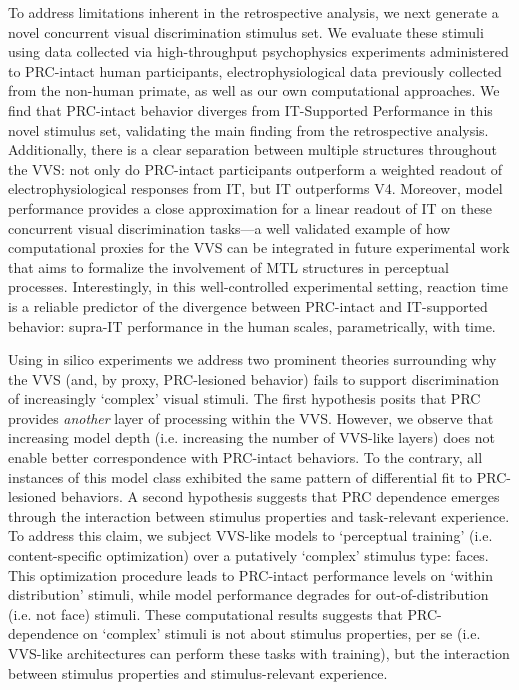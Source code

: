 \documentclass[11pt]{article}
\begin{document}
To address limitations inherent in the retrospective analysis, we next generate a novel concurrent visual discrimination stimulus set. We evaluate these stimuli using data collected via high-throughput psychophysics experiments administered to PRC-intact human participants, electrophysiological data previously collected from the non-human primate, as well as our own computational approaches. We find that PRC-intact behavior diverges from IT-Supported Performance in this novel stimulus set, validating the main finding from the retrospective analysis. Additionally, there is a clear separation between multiple structures throughout the VVS: not only do PRC-intact participants outperform a weighted readout of electrophysiological responses from IT, but IT outperforms V4. Moreover, model performance provides a close approximation for a linear readout of IT on these concurrent visual discrimination tasks---a well validated example of how computational proxies for the VVS can be integrated in future experimental work that aims to formalize the involvement of MTL structures in perceptual processes. Interestingly, in this well-controlled experimental setting, reaction time is a reliable predictor of the divergence between PRC-intact and IT-supported behavior: supra-IT performance in the human scales, parametrically, with time. 

Using in silico experiments we address two prominent theories surrounding why the VVS (and, by proxy, PRC-lesioned behavior) fails to support discrimination of increasingly `complex' visual stimuli. The first hypothesis posits that PRC provides \textit{another} layer of processing within the VVS. However, we observe that increasing model depth (i.e. increasing the number of VVS-like layers) does not enable better correspondence with PRC-intact behaviors. To the contrary, all instances of this model class exhibited the same pattern of differential fit to PRC-lesioned behaviors. A second hypothesis suggests that PRC dependence emerges through the interaction between stimulus properties and task-relevant experience. To address this claim, we subject VVS-like models to `perceptual training' (i.e. content-specific optimization) over a putatively `complex' stimulus type: faces. This optimization procedure leads to PRC-intact performance levels on ‘within distribution’ stimuli, while model performance degrades for out-of-distribution (i.e. not face) stimuli. These computational results suggests that PRC-dependence on `complex' stimuli is not about stimulus properties, per se (i.e. VVS-like architectures can perform these tasks with training), but the interaction between stimulus properties and stimulus-relevant experience.
\end{document}
